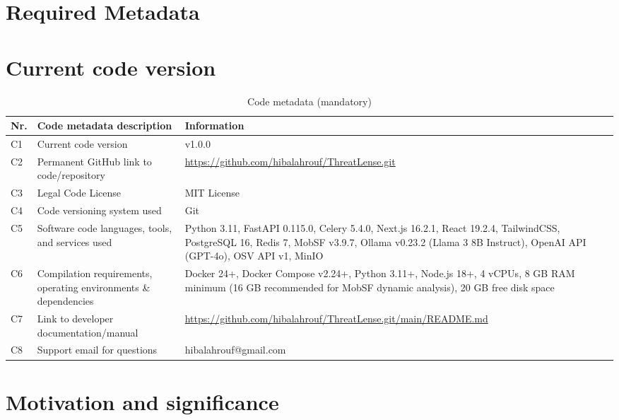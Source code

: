 \documentclass[preprint,12pt,a4paper]{elsarticle}
\begin{document}
\section*{Required Metadata}

\section*{Current code version}

\begin{table}[!h]
\centering
\begin{tabular}{|l|p{5.5cm}|p{6.5cm}|}
\hline
\textbf{Nr.} & \textbf{Code metadata description} & \textbf{Information} \\
\hline
C1 & Current code version & v1.0.0 \\
\hline
C2 & Permanent GitHub link to code/repository &
\url{https://github.com/hibalahrouf/ThreatLense.git} \\
\hline
C3 & Legal Code License & MIT License \\
\hline
C4 & Code versioning system used & Git \\
\hline
C5 & Software code languages, tools, and services used &
Python 3.11, FastAPI 0.115.0, Celery 5.4.0, Next.js 16.2.1, React 19.2.4, TailwindCSS, PostgreSQL 16, Redis 7, MobSF v3.9.7, Ollama v0.23.2 (Llama 3 8B Instruct), OpenAI API (GPT-4o), OSV API v1, MinIO \\
\hline
C6 & Compilation requirements, operating environments \& dependencies &
Docker 24+, Docker Compose v2.24+, Python 3.11+, Node.js 18+, 4 vCPUs, 8 GB RAM minimum (16 GB recommended for MobSF dynamic analysis), 20 GB free disk space \\
\hline
C7 & Link to developer documentation/manual &
\url{https://github.com/hibalahrouf/ThreatLense.git/main/README.md}  \\
\hline
C8 & Support email for questions & hibalahrouf@gmail.com\\
\hline
\end{tabular}
\caption{Code metadata (mandatory)}
\label{tab:metadata}
\end{table}

\section{Motivation and significance}
\end{document}
